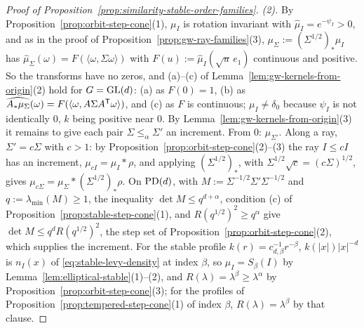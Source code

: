 \begin{proof}[Proof of Proposition~\ref{prop:similarity-stable-order-families}]
\emph{(2).} By Proposition~\ref{prop:orbit-step-cone}(1), $\mu_I$ is rotation invariant with
$\widehat\mu_I = e^{-\psi_I} > 0$, and as in the proof of Proposition~\ref{prop:gw-ray-families}(3),
$\mu_\Sigma := (\Sigma^{1/2})_*\mu_I$ has $\widehat\mu_\Sigma(\omega) = F(\langle\omega,\Sigma\omega\rangle)$
with $F(u) := \widehat\mu_I(\sqrt u\,e_1)$ continuous and positive. So the transforms have no zeros, and
(a)--(c) of Lemma~\ref{lem:gw-kernels-from-origin}(2) hold for $G = \mathrm{GL}(d)$: (a) as $F(0) = 1$, (b) as
$\widehat{A_*\mu_\Sigma}(\omega) = F(\langle\omega,A\Sigma A^{\mathsf{T}}\omega\rangle)$, and (c) as $F$ is
continuous;
$\mu_I \ne \delta_0$ because
$\psi_I$ is not identically $0$, $k$ being positive near $0$. By
Lemma~\ref{lem:gw-kernels-from-origin}(3) it remains to give each pair $\Sigma \le_\alpha \Sigma'$ an
increment. From $0$: $\mu_{\Sigma'}$. Along a ray, $\Sigma' = c\Sigma$ with $c > 1$: by
Proposition~\ref{prop:orbit-step-cone}(2)--(3) the ray $I \le cI$ has an increment, $\mu_{cI} = \mu_I *
\rho$, and applying $(\Sigma^{1/2})_*$, with $\Sigma^{1/2}\sqrt c = (c\Sigma)^{1/2}$, gives $\mu_{c\Sigma} =
\mu_\Sigma * (\Sigma^{1/2})_*\rho$. On $\mathrm{PD}(d)$, with $M := \Sigma^{-1/2}\Sigma'\Sigma^{-1/2}$ and $q := \lambda_{\min}(M) \ge 1$, the inequality
$\det M \le q^{d+\alpha}$, condition (c) of Proposition~\ref{prop:stable-step-cone}(1), and $R(q^{1/2})^2 \ge q^\alpha$
give $\det M \le q^dR(q^{1/2})^2$, the step set of Proposition~\ref{prop:orbit-step-cone}(2), which supplies the
increment. For the stable profile $k(r) = c_{d,\beta}^{-1}r^{-\beta}$, $k(|x|)|x|^{-d}$ is $n_I(x)$ of
\ref{eq:stable-levy-density} at index $\beta$, so $\mu_I = S_\beta(I)$ by
Lemma~\ref{lem:elliptical-stable}(1)--(2), and $R(\lambda) = \lambda^\beta \ge \lambda^\alpha$ by
Proposition~\ref{prop:orbit-step-cone}(3); for the profiles of Proposition~\ref{prop:tempered-step-cone}(1)
of index $\beta$, $R(\lambda) = \lambda^\beta$ by that clause.
\end{proof}

